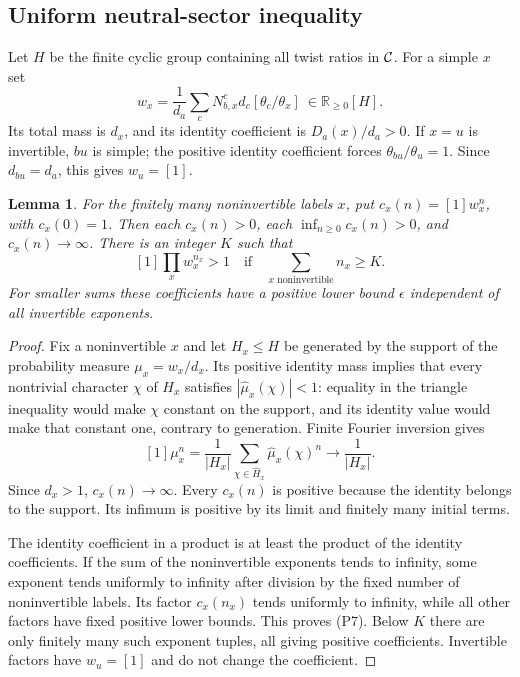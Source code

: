 \documentclass[10pt]{amsart}
\newtheorem{lemma}[theorem]{Lemma}
\begin{document}
\subsection{Uniform neutral-sector inequality}
Let $H$ be the finite cyclic group containing all twist ratios
in $\mathcal C$. For a simple $x$ set
\[
 w_x=\frac1{d_a}\sum_c N_{b,x}^c d_c[\theta_c/\theta_x]
                      \ \in\mathbb R_{\ge0}[H].                 \tag{P6}
\]
Its total mass is $d_x$, and its identity coefficient is
$D_a(x)/d_a>0$. If $x=u$ is invertible, $bu$ is simple;
the positive identity coefficient forces
$\theta_{bu}/\theta_u=1$. Since $d_{bu}=d_a$, this gives
$w_u=[1]$.

\begin{lemma}\label{coefficient}
For the finitely many noninvertible labels $x$, put
$c_x(n)=[1]w_x^n$, with $c_x(0)=1$. Then each $c_x(n)>0$,
each $\inf_{n\ge0}c_x(n)>0$, and $c_x(n)\to\infty$.
There is an integer $K$ such that
\[
 [1]\prod_x w_x^{n_x}>1
       \quad\text{if}\quad\sum_{x\text{ noninvertible}}n_x\ge K.
                                                               \tag{P7}
\]
For smaller sums these coefficients have a positive lower bound
$\epsilon$ independent of all invertible exponents.
\end{lemma}
\begin{proof}
Fix a noninvertible $x$ and let $H_x\le H$ be generated by
the support of the probability measure $\mu_x=w_x/d_x$.
Its positive identity mass implies that every nontrivial
character $\chi$ of $H_x$ satisfies
$|\widehat\mu_x(\chi)|<1$: equality in the triangle
inequality would make $\chi$ constant on the support,
and its identity value would make that constant one,
contrary to generation. Finite Fourier inversion gives
\[
  [1]\mu_x^n=\frac1{|H_x|}
            \sum_{\chi\in\widehat H_x}\widehat\mu_x(\chi)^n
            \longrightarrow\frac1{|H_x|}.
\]
Since $d_x>1$, $c_x(n)\to\infty$. Every $c_x(n)$ is
positive because the identity belongs to the support.
Its infimum is positive by its limit and finitely many
initial terms.

The identity coefficient in a product is at least the
product of the identity coefficients. If the sum of the
noninvertible exponents tends to infinity, some exponent
tends uniformly to infinity after division by the fixed
number of noninvertible labels. Its factor $c_x(n_x)$
tends uniformly to infinity, while all other factors
have fixed positive lower bounds. This proves (P7).
Below $K$ there are only finitely many such exponent tuples,
all giving positive coefficients. Invertible factors have
$w_u=[1]$ and do not change the coefficient.
\end{proof}
\end{document}
